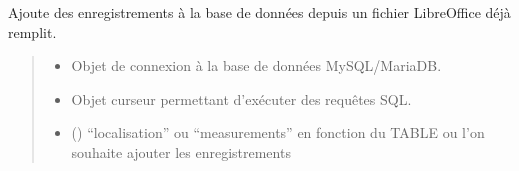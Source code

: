 \documentclass[letterpaper,10pt,french]{sphinxmanual}
\begin{document}
\begin{fulllineitems}
\label{\detokenize{library:lib_sql.add_from_DATA}}
\pysigstartsignatures
\pysiglinewithargsret
{}
{\sphinxparamcomma {}\sphinxparamcomma {}}
{}
\pysigstopsignatures
\sphinxAtStartPar
Ajoute des enregistrements à la base de données depuis un fichier LibreOffice déjà remplit.
\begin{quote}\begin{description}
\begin{itemize}
\item {} 
\sphinxAtStartPar
{} \textendash{} Objet de connexion à la base de données MySQL/MariaDB.

\item {} 
\sphinxAtStartPar
{} \textendash{} Objet curseur permettant d’exécuter des requêtes SQL.

\item {} 
\sphinxAtStartPar
{} () \textendash{} “localisation” ou “measurements” en fonction du TABLE ou l’on souhaite
ajouter les enregistrements

\end{itemize}

\end{description}\end{quote}

\end{fulllineitems}

\end{document}
